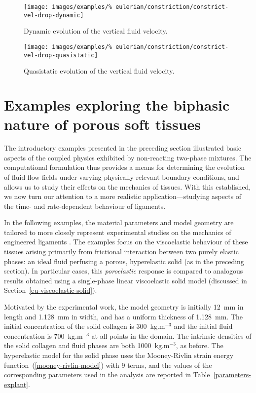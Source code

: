 \begin{figure}[!hptb]
  \centering
  \texttt{[image: images/examples/\%
    eulerian/constriction/constrict-vel-drop-dynamic]}
  \caption{Dynamic evolution of the vertical fluid velocity.}
  \label{velocity-evolution-dynamic}
\end{figure}

\begin{figure}[!hptb]
  \centering
  \texttt{[image: images/examples/\%
    eulerian/constriction/constrict-vel-drop-quasistatic]}
  \caption{Quasistatic evolution of the vertical fluid velocity.}
  \label{velocity-evolution-quasistatic}
\end{figure}

\clearpage

\section{Examples exploring the biphasic nature of porous soft
  tissues}
\label{biphasic-examples-2}

The introductory examples presented in the preceding section
illustrated basic aspects of the coupled physics exhibited by
non-reacting two-phase mixtures. The computational formulation thus
provides a means for determining the evolution of fluid flow fields
under varying physically-relevant boundary conditions, and allows us
to study their effects on the mechanics of tissues. With this
established, we now turn our attention to a more realistic
application---studying aspects of the time- and rate-dependent
behaviour of ligaments.

In the following examples, the material parameters and model geometry
are tailored to more closely represent experimental studies on the
mechanics of engineered ligaments \citep{ma:07}. The examples focus on
the viscoelastic behaviour of these tissues arising primarily from
frictional interaction between two purely elastic phases: an ideal
fluid perfusing a porous, hyperelastic solid (as in the preceding
section). In particular cases, this {\em poroelastic} response is
compared to analogous results obtained using a single-phase linear
viscoelastic solid model (discussed in
Section~\ref{eu-viscoelastic-solid}).

Motivated by the experimental work, the model geometry is initially
12~mm in length and 1.128~mm in width, and has a uniform thickness of
1.128~mm. The initial concentration of the solid collagen is
300~kg.m$^{-3}$ and the initial fluid concentration is 700~kg.m$^{-3}$
at all points in the domain. The intrinsic densities of the solid
collagen and fluid phases are both 1000~kg.m$^{-3}$, as before. The
hyperelastic model for the solid phase uses the Mooney-Rivlin strain
energy function~(\ref{mooney-rivlin-model}) with 9 terms, and the
values of the corresponding parameters used in the analysis are
reported in Table~\ref{parameters-explant}.

